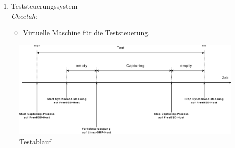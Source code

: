 \begin{enumerate}
\begin{itemize}
\begin{itemize}
						Interrupt-Throttling\footnote{Die Details
						zur Interrupt-Throttling finden sich im  Abschnitt
						\ref{sec:intr_coal}} eingesetzt:
						\begin{itemize}
							\item 8000 Interrupts pro Sekunde maximal
						\end{itemize}
				\end{itemize}
		\end{itemize}
	\item Teststeuerungssystem \\ \emph{Cheetah}:
		\begin{itemize}
			\item Virtuelle Maschine für die Teststeuerung.
		\end{itemize}
\end{enumerate}
\begin{figure} 
\centering \includegraphics[width=6.5in]{bilder/Test_Zeit_Ablauf}
\caption{Testablauf}
\label{img:test_ablauf}
\end{figure}
